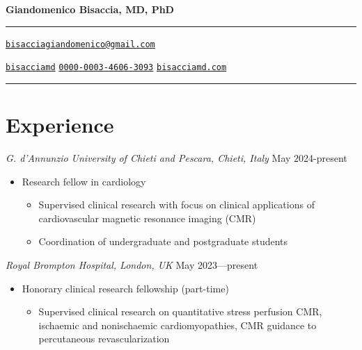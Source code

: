 \documentclass[
  11pt,
]
{article}
\providecommand{\tightlist}{%
  \setlength{\itemsep}{0pt}\setlength{\parskip}{0pt}}
\begin{document}
\centerline{\huge \bf Giandomenico Bisaccia, MD, PhD}

\vspace{2 mm}

\hrule

\vspace{2 mm}



\centerline{\faEnvelope \hspace{1 mm} \href{mailto:}{\tt bisacciagiandomenico@gmail.com} \hspace{1 mm} }
\centerline{  \faLinkedin \hspace{1 mm} \href{https://www.linkedin.com/in/bisacciamd}{\tt bisacciamd} \hspace{1 mm}   \hspace{.5 mm} \href{https://orcid.org/0000-0003-4606-3093}{\tt 0000-0003-4606-3093} \hspace{1 mm}  \faLink \hspace{1 mm} \href{http://bisacciamd.com}{\tt bisacciamd.com}  }



\vspace{2 mm}

\hrule



\section{Experience}\label{experience}

\emph{G. d'Annunzio University of Chieti and Pescara, Chieti, Italy}
\hfill May 2024-present

\begin{itemize}
\tightlist
\item
  Research fellow in cardiology

  \begin{itemize}
  \tightlist
  \item
    Supervised clinical research with focus on clinical applications of
    cardiovascular magnetic resonance imaging (CMR)
  \item
    Coordination of undergraduate and postgraduate students
  \end{itemize}
\end{itemize}

\emph{Royal Brompton Hospital, London, UK} \hfill May 2023---present

\begin{itemize}
\tightlist
\item
  Honorary clinical research fellowship (part-time)

  \begin{itemize}
  \tightlist
  \item
    Supervised clinical research on quantitative stress perfusion CMR,
    ischaemic and nonischaemic cardiomyopathies, CMR guidance to
    percutaneous revascularization
  \end{itemize}
\end{itemize}
\end{document}
